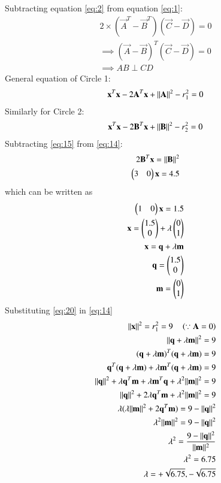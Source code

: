 \documentclass[journal,12pt,twocolumn]{IEEEtran}
\begin{document}
Subtracting equation \ref{eq:2} from equation \ref{eq:1}:
\begin{align}
2\times(\vec{A}^T-\vec{B}^T)(\vec{C}-\vec{D})=0
\\
\implies (\vec{A}-\vec{B})^T(\vec{C}-\vec{D})=0
\\
\implies AB\perp CD
\end{align}
General equation of Circle 1:
\begin{align}
\mathbf{x}^T\mathbf{x} - 2\mathbf{A}^T\mathbf{x} + \lVert\mathbf{A}\rVert^2 -r_{1}^2 = 0\label{eq:14}
\end{align}
Similarly for Circle 2:
\begin{align}
\mathbf{x}^T\mathbf{x} - 2\mathbf{B}^T\mathbf{x} + \lVert\mathbf{B}\rVert^2 -r_{2}^2 = 0\label{eq:15}
\end{align}
Subtracting \eqref{eq:15} from \eqref{eq:14}:
\begin{align}
2\mathbf{B}^T\mathbf{x}=\lVert\mathbf{B}\rVert^2
\\
\begin{pmatrix}3&0\end{pmatrix}\mathbf{x}=4.5
\end{align}
which can be written as
\begin{align}
\begin{pmatrix}1&0\end{pmatrix}\mathbf{x}=1.5\\
\mathbf{x}=\begin{pmatrix}1.5\\ 0\end{pmatrix} + \lambda \begin{pmatrix}0\\1\end{pmatrix}\label{eq:19}\\
\mathbf{x}=\mathbf{q}+\lambda\mathbf{m}\label{eq:20}\\
\mathbf{q}=\begin{pmatrix}1.5\\ 0\end{pmatrix} \\
\mathbf{m}=\begin{pmatrix}0\\1\end{pmatrix}
\end{align}
Substituting \eqref{eq:20} in \eqref{eq:14}
\begin{align}
\lVert\mathbf{x}\rVert^2=r_{1}^2=9\quad \left(\because \mathbf{A}=0\right)
\\
\lVert\mathbf{q}+\lambda\mathbf{m}\rVert^2=9\\
(\mathbf{q}+\lambda \mathbf{m})^T(\mathbf{q}+\lambda \mathbf{m})=9\\
\mathbf{q}^T(\mathbf{q}+\lambda \mathbf{m})+\lambda \mathbf{m}^T(\mathbf{q}+\lambda \mathbf{m})=9
\\
\lVert\mathbf{q}\rVert^2+\lambda\mathbf{q}^T\mathbf{m}+\lambda\mathbf{m}^T\mathbf{q}+\lambda^2\lVert\mathbf{m}\rVert^2=9
\\
\lVert\mathbf{q}\rVert^2+2\lambda\mathbf{q}^T\mathbf{m}+\lambda^2\lVert\mathbf{m}\rVert^2=9 
\\
\lambda(\lambda\lVert\mathbf{m}\rVert^2+2\mathbf{q}^T\mathbf{m})=9-\lVert\mathbf{q}\rVert^2\\
\lambda^2\lVert\mathbf{m}\rVert^2=9-\lVert\mathbf{q}\rVert^2
\\
\lambda^2=\frac{9-\lVert\mathbf{q}\rVert^2}{\lVert\mathbf{m}\rVert^2}\\
\lambda^2=6.75\\
\lambda=+\sqrt{6.75},-\sqrt{6.75}
\end{align}
\end{document}
